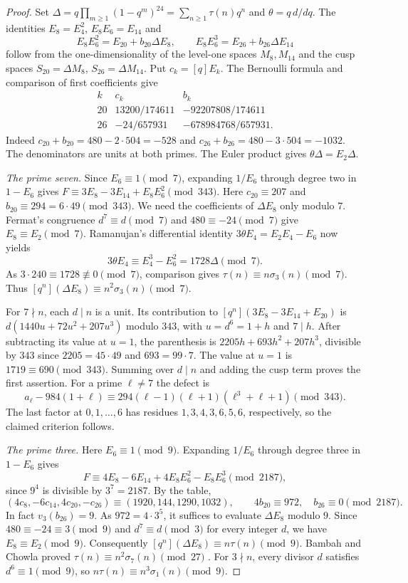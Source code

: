 \documentclass[11pt]{article}
\begin{document}
\begin{proof}
Set $\Delta=q\prod_{m\ge1}(1-q^m)^{24}=\sum_{n\ge1}\tau(n)q^n$ and
$\theta=q\,d/dq$. The identities $E_8=E_4^2$, $E_8E_6=E_{14}$ and
\[
 E_8E_6^2=E_{20}+b_{20}\Delta E_8,\qquad
 E_8E_6^3=E_{26}+b_{26}\Delta E_{14}
\]
follow from the one-dimensionality of the level-one spaces
$M_8,M_{14}$ and the cusp spaces $S_{20}=\Delta M_8$,
$S_{26}=\Delta M_{14}$. Put $c_k=[q]E_k$. The Bernoulli formula
and comparison of first coefficients give
\[
 \begin{array}{c|rr}
 k&c_k&b_k\\ \hline
 20&13200/174611&-92207808/174611\\
 26&-24/657931&-678984768/657931 .
 \end{array}
\]
Indeed $c_{20}+b_{20}=480-2\cdot504=-528$ and
$c_{26}+b_{26}=480-3\cdot504=-1032$. The denominators are units
at both primes. The Euler product gives $\theta\Delta=E_2\Delta$.

\emph{The prime seven.}
Since $E_6\equiv1\pmod7$, expanding $1/E_6$ through degree two in
$1-E_6$ gives $F\equiv3E_8-3E_{14}+E_8E_6^2\pmod{343}$.
Here $c_{20}\equiv207$ and $b_{20}\equiv294=6\cdot49\pmod{343}$.
We need the coefficients of $\Delta E_8$ only modulo $7$.
Fermat's congruence $d^7\equiv d\pmod7$ and $480\equiv-24\pmod7$
give $E_8\equiv E_2\pmod7$. Ramanujan's differential identity
$3\theta E_4=E_2E_4-E_6$ now yields
\[
 3\theta E_4\equiv E_4^3-E_6^2=1728\Delta\pmod7 .
\]
As $3\cdot240\equiv1728\not\equiv0\pmod7$, comparison gives
$\tau(n)\equiv n\sigma_3(n)\pmod7$. Thus
$[q^n](\Delta E_8)\equiv n^2\sigma_3(n)\pmod7$.

For $7\nmid n$, each $d\mid n$ is a unit. Its contribution to
$[q^n](3E_8-3E_{14}+E_{20})$ is $d(1440u+72u^2+207u^3)$
modulo $343$, with $u=d^6=1+h$ and $7\mid h$.
After subtracting its value at $u=1$, the parenthesis is
$2205h+693h^2+207h^3$, divisible by $343$ since
$2205=45\cdot49$ and $693=99\cdot7$.
The value at $u=1$ is $1719\equiv690\pmod{343}$.
Summing over $d\mid n$ and adding the cusp term proves the
first assertion. For a prime $\ell\ne7$ the defect is
\[
 a_\ell-984(1+\ell)
 \equiv294(\ell-1)(\ell+1)(\ell^3+\ell+1)\pmod{343}.
\]
The last factor at $0,1,\ldots,6$ has residues
$1,3,4,3,6,5,6$, respectively, so the claimed criterion follows.

\emph{The prime three.}
Here $E_6\equiv1\pmod9$. Expanding $1/E_6$ through degree three in
$1-E_6$ gives
\[
 F\equiv4E_8-6E_{14}+4E_8E_6^2-E_8E_6^3\pmod{2187},
\]
since $9^4$ is divisible by $3^7=2187$. By the table,
\[
 (4c_8,-6c_{14},4c_{20},-c_{26})\equiv
 (1920,144,1290,1032),\qquad
 4b_{20}\equiv972,\quad b_{26}\equiv0\pmod{2187}.
\]
In fact $v_3(b_{26})=9$. As $972=4\cdot3^5$, it suffices
to evaluate $\Delta E_8$ modulo $9$. Since $480\equiv-24\equiv3\pmod9$
and $d^7\equiv d\pmod3$ for every integer $d$, we have
$E_8\equiv E_2\pmod9$. Consequently
$[q^n](\Delta E_8)\equiv n\tau(n)\pmod9$.
Bambah and Chowla proved $\tau(n)\equiv n^2\sigma_7(n)\pmod{27}$ \cite[eq.~(16)]{bc}.
For $3\nmid n$, every divisor $d$ satisfies $d^6\equiv1\pmod9$,
so $n\tau(n)\equiv n^3\sigma_1(n)\pmod9$.


\end{proof}
\end{document}

